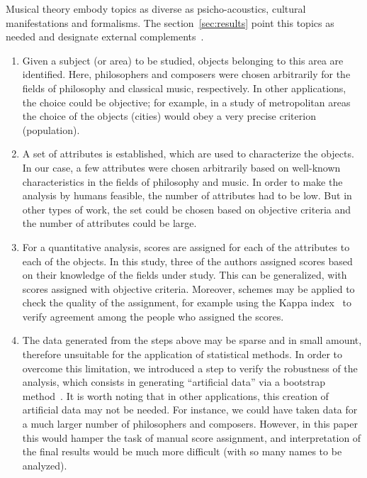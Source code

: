 \documentclass[
 aip,
 jmp,
 amsmath,amssymb,
 reprint,
]{revtex4-1}
\begin{document}
Musical theory embody topics as diverse as psicho-acoustics, cultural manifestations and formalisms. The section~\ref{sec:results} point this topics as needed and designate external complements~\cite{Zamacois,Schoenberg,microsound}.



\begin{enumerate}
  \item{Given a subject (or area) to be studied, objects belonging to
    this area are identified. Here, philosophers and composers were
    chosen arbitrarily for the fields of philosophy and classical
    music, respectively. In other applications, the choice could be
    objective; for example, in a study of metropolitan areas the
    choice of the objects (cities) would obey a very precise criterion
    (population).}

  \item{A set of attributes is established, which are used to
    characterize the objects. In our case, a few attributes were
    chosen arbitrarily based on well-known characteristics in the
    fields of philosophy and music. In order to make the analysis by
    humans feasible, the number of attributes had to be low. But in
    other types of work, the set could be chosen based on objective
    criteria and the number of attributes could be large.}

  \item{For a quantitative analysis, scores are assigned for each of
    the attributes to each of the objects. In this study, three of the
    authors assigned scores based on their knowledge of the fields
    under study. This can be generalized, with scores assigned with
    objective criteria. Moreover, schemes may be applied to check the
    quality of the assignment, for example using the Kappa
    index~\cite{Cohen1960} to verify agreement among the people who
    assigned the scores.}

  \item{The data generated from the steps above may be sparse and in
    small amount, therefore unsuitable for the application of
    statistical methods. In order to overcome this limitation, we
    introduced a step to verify the robustness of the analysis, which
    consists in generating ``artificial data'' via a bootstrap
    method~\cite{Boos2003}. It is worth noting that in other
    applications, this creation of artificial data may not be
    needed. For instance, we could have taken data for a much larger
    number of philosophers and composers. However, in this paper this
    would hamper the task of manual score assignment, and
    interpretation of the final results would be much more difficult
    (with so many names to be analyzed).}


\end{enumerate}
\end{document}
